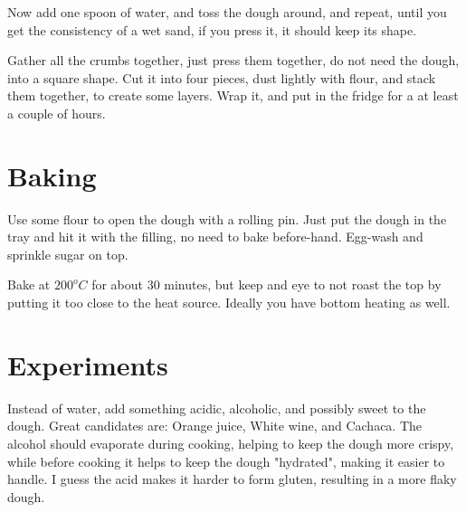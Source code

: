 Now add one spoon of water, and toss the dough around, and repeat, until you get the consistency of a wet sand, if you press it, it should keep its shape.

Gather all the crumbs together, just press them together, do not need the dough, into a square shape.
%
Cut it into four pieces, dust lightly with flour, and stack them together, to create some layers.
%
Wrap it, and put in the fridge for a at least a couple of hours.

\section{Baking}
Use some flour to open the dough with a rolling pin. 
%
Just put the dough in the tray and hit it with the filling, no need to bake before-hand. 
%
Egg-wash and sprinkle sugar on top.

Bake at $200^oC$ for about $30$ minutes, but keep and eye to not roast the top by putting it too close to the heat source. Ideally you have bottom heating as well.

\section{Experiments}
Instead of water, add something acidic, alcoholic, and possibly sweet to the dough. Great candidates are: Orange juice, White wine, and Cachaca.
%
The alcohol should evaporate during cooking, helping to keep the dough more crispy, while before cooking it helps to keep the dough "hydrated", making it easier to handle.
%
I guess the acid makes it harder to form gluten, resulting in a more flaky dough.

